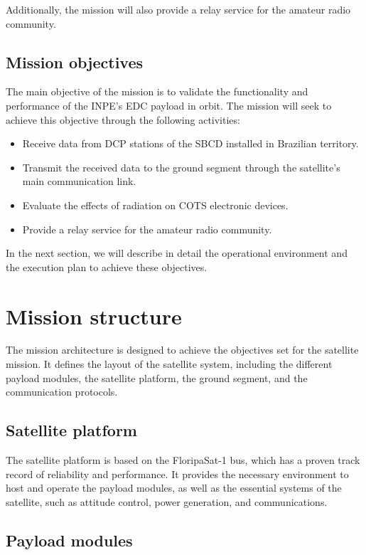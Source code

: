 Additionally, the mission will also provide a relay service for the amateur radio community.

\subsection{Mission objectives}

The main objective of the mission is to validate the functionality and performance of the INPE's EDC payload in orbit. The mission will seek to achieve this objective through the following activities:

\begin{itemize}
    \item Receive data from DCP stations of the SBCD installed in Brazilian territory.
    \item Transmit the received data to the ground segment through the satellite's main communication link.
    \item Evaluate the effects of radiation on COTS electronic devices.
    \item Provide a relay service for the amateur radio community.
\end{itemize}

In the next section, we will describe in detail the operational environment and the execution plan to achieve these objectives.

\section{Mission structure}


The mission architecture is designed to achieve the objectives set for the satellite mission. It defines the layout of the satellite system, including the different payload modules, the satellite platform, the ground segment, and the communication protocols.

\subsection{Satellite platform}

The satellite platform is based on the FloripaSat-1 bus, which has a proven track record of reliability and performance. It provides the necessary environment to host and operate the payload modules, as well as the essential systems of the satellite, such as attitude control, power generation, and communications.

\subsection{Payload modules}


